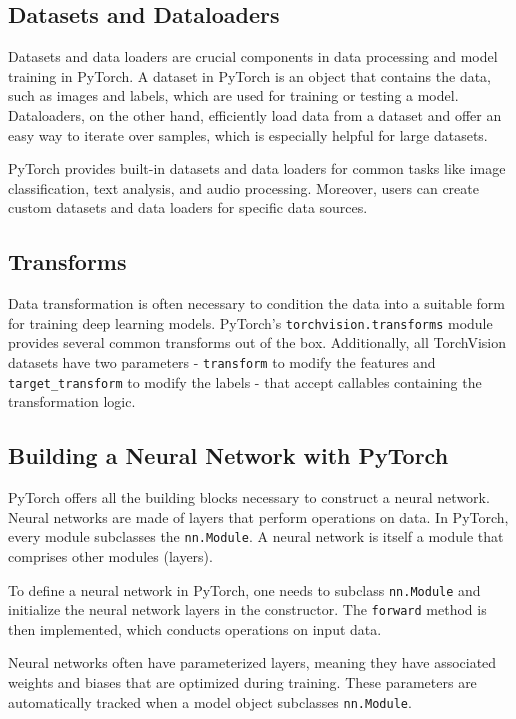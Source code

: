 \subsection{Datasets and Dataloaders}

Datasets and data loaders are crucial components in data processing and model training in PyTorch. A dataset in PyTorch is an object that contains the data, such as images and labels, which are used for training or testing a model. Dataloaders, on the other hand, efficiently load data from a dataset and offer an easy way to iterate over samples, which is especially helpful for large datasets.

PyTorch provides built-in datasets and data loaders for common tasks like image classification, text analysis, and audio processing. Moreover, users can create custom datasets and data loaders for specific data sources.

\subsection{Transforms}

Data transformation is often necessary to condition the data into a suitable form for training deep learning models. PyTorch's \verb|torchvision.transforms| module provides several common transforms out of the box. Additionally, all TorchVision datasets have two parameters - \verb|transform| to modify the features and \verb|target_transform| to modify the labels - that accept callables containing the transformation logic.

\subsection{Building a Neural Network with PyTorch}

PyTorch offers all the building blocks necessary to construct a neural network. Neural networks are made of layers that perform operations on data. In PyTorch, every module subclasses the \verb|nn.Module|. A neural network is itself a module that comprises other modules (layers). 

To define a neural network in PyTorch, one needs to subclass \verb|nn.Module| and initialize the neural network layers in the constructor. The \verb|forward| method is then implemented, which conducts operations on input data.

Neural networks often have parameterized layers, meaning they have associated weights and biases that are optimized during training. These parameters are automatically tracked when a model object subclasses \verb|nn.Module|.

